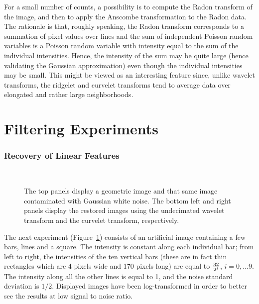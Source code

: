 For a small number of counts, a possibility is to compute the Radon
transform of the image, and then to apply the Anscombe transformation
to the Radon data. The rationale is that, roughly speaking, the
Radon transform corresponds to a summation of pixel values over lines
and  the sum of independent Poisson random variables is a Poisson
random variable with intensity equal to the sum of the individual
intensities. Hence, the intensity of the sum may be quite large (hence
validating the Gaussian approximation) even though the individual
intensities may be small. This might be viewed as an interesting
feature  since,  unlike wavelet transforms, the ridgelet and curvelet
transforms tend to average data over elongated and rather large
neighborhoods.

\section{Filtering Experiments}

\subsubsection{Recovery of Linear Features}

\begin{figure}[htb]
\centerline{
\vbox{
\hbox{
}
\hbox{
}}}
\caption{The top panels display a geometric image and that same image
      contaminated with Gaussian white noise. The bottom left and right
      panels display the restored images using the undecimated wavelet
      transform and the curvelet transform, respectively.}
\label{fig_cur_line}
\end{figure}
The next experiment (Figure~\ref{fig_cur_line}) consists of an
artificial image containing a few bars, lines and a square.  The
intensity is constant along each individual bar; from left to right,
the intensities of the ten vertical bars (these are in fact thin
rectangles which are 4 pixels wide and 170 pixels long) are equal to
${32 \over 2^i}$, $i = 0, \ldots 9$.  The intensity along all the
other lines is equal to 1, and the noise standard deviation is $1/2$.
Displayed images have been log-transformed in order to better see
the results at low signal to noise ratio.

